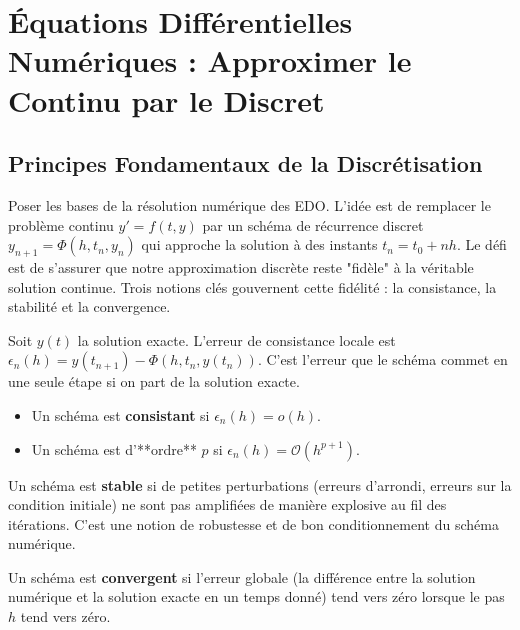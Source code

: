 \chapter{Équations Différentielles Numériques : Approximer le Continu par le Discret}

\section{Principes Fondamentaux de la Discrétisation}

\begin{objectif}
    Poser les bases de la résolution numérique des EDO. L'idée est de remplacer le problème continu $y'=f(t,y)$ par un schéma de récurrence discret $y_{n+1} = \Phi(h, t_n, y_n)$ qui approche la solution à des instants $t_n = t_0+nh$. Le défi est de s'assurer que notre approximation discrète reste "fidèle" à la véritable solution continue. Trois notions clés gouvernent cette fidélité : la consistance, la stabilité et la convergence.
\end{objectif}

\begin{definition}
    Soit $y(t)$ la solution exacte. L'erreur de consistance locale est $\epsilon_n(h) = y(t_{n+1}) - \Phi(h, t_n, y(t_n))$. C'est l'erreur que le schéma commet en une seule étape si on part de la solution exacte.
    \begin{itemize}
        \item Un schéma est \textbf{consistant} si $\epsilon_n(h) = o(h)$.
        \item Un schéma est d'**ordre** $p$ si $\epsilon_n(h) = \mathcal{O}(h^{p+1})$.
    \end{itemize}
\end{definition}

\begin{definition}[Stabilité]
    Un schéma est \textbf{stable} si de petites perturbations (erreurs d'arrondi, erreurs sur la condition initiale) ne sont pas amplifiées de manière explosive au fil des itérations. C'est une notion de robustesse et de bon conditionnement du schéma numérique.
\end{definition}

\begin{definition}[Convergence]
    Un schéma est \textbf{convergent} si l'erreur globale (la différence entre la solution numérique et la solution exacte en un temps donné) tend vers zéro lorsque le pas $h$ tend vers zéro.
\end{definition}


